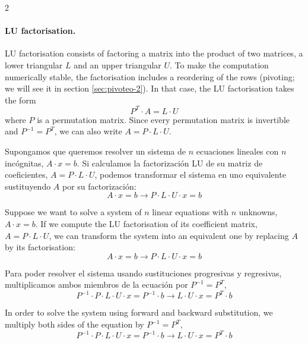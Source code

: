 \begin{paracol}{2}
\switchcolumn

\paragraph{LU factorisation.} LU factorisation consists of factoring a matrix into the product of two matrices, a lower triangular $L$ and an upper triangular $U$. To make the computation numerically stable, the factorisation includes a reordering of the rows (pivoting; we will see it in section \ref{sec:pivoteo-2}). In that case, the LU factorisation takes the form
\begin{equation*}
P^T \cdot A = L\cdot U
\end{equation*}
where $P$ is a permutation matrix. Since every permutation matrix is invertible and $P^{-1}=P^T$, we can also write $A=P \cdot L \cdot U$.

\switchcolumn
Supongamos que queremos resolver un sistema de $n$ ecuaciones lineales con $n$ incógnitas, $A\cdot x=b$. Si calculamos la factorización LU de su matriz de coeficientes, $A = P\cdot L\cdot U$, podemos transformar el sistema en uno equivalente sustituyendo $A$ por su factorización:
\begin{equation*}
A\cdot x=b\rightarrow P\cdot L \cdot U \cdot x= b
\end{equation*}

\switchcolumn
Suppose we want to solve a system of $n$ linear equations with $n$ unknowns, $A\cdot x=b$. If we compute the LU factorisation of its coefficient matrix, $A = P\cdot L\cdot U$, we can transform the system into an equivalent one by replacing $A$ by its factorisation:
\begin{equation*}
A\cdot x=b\rightarrow P\cdot L \cdot U \cdot x= b
\end{equation*}

\switchcolumn
Para poder resolver el sistema usando sustituciones progresivas y regresivas, multiplicamos ambos miembros de la ecuación por $P^{-1}=P^T$,
\begin{equation*}
P^{-1} \cdot P\cdot L \cdot U \cdot x=P^{-1}\cdot b \rightarrow L\cdot U \cdot x= P^T\cdot b
\end{equation*}

\switchcolumn
In order to solve the system using forward and backward substitution, we multiply both sides of the equation by $P^{-1}=P^T$,
\begin{equation*}
P^{-1} \cdot P\cdot L \cdot U \cdot x=P^{-1}\cdot b \rightarrow L\cdot U \cdot x= P^T\cdot b
\end{equation*}


\end{paracol}
